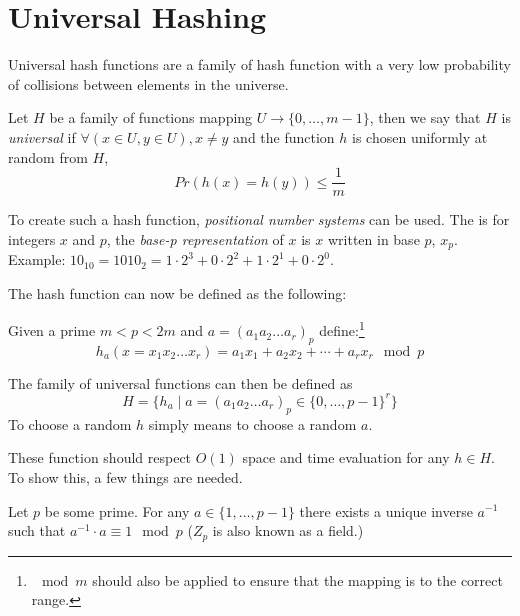     \section{Universal Hashing}

        Universal hash functions are a family of hash function with a very low probability of collisions between elements in the universe.

        \begin{definition}
        Let $H$ be a family of functions mapping $U \rightarrow \{0, \ldots, m-1\}$, then we say that $H$ is \emph{universal} if $\forall (x \in U, y \in U), x \not = y$ and the function $h$ is chosen uniformly at random from $H$,
            \[ Pr(h(x) = h(y)) \leq \frac{1}{m} \]
        \end{definition}

        To create such a hash function, \emph{positional number systems} can be used. The is for integers $x$ and $p$, the \emph{base-p representation} of $x$ is $x$ written in base $p$, $x_p$. Example: $10_{10} = 1010_2 = 1 \cdot 2^3 + 0 \cdot 2^2 + 1 \cdot 2^1 + 0 \cdot 2^0$.

        The hash function can now be defined as the following:

        \begin{definition}
            Given a prime $m < p < 2m$ and $a = (a_1 a_2 \ldots a_r)_p$ define:\footnote{$\mod m$ should also be applied to ensure that the mapping is to the correct range.}
            \[ h_a(x = x_1 x_2 \ldots x_r) = a_1 x_1 + a_2 x_2 + \cdots + a_r x_r \mod p \]
        \end{definition}

        The family of universal functions can then be defined as
        \[ H = \{ h_a \mid a = (a_1 a_2 \ldots a_r)_p \in \{0, \ldots, p-1\}^r\} \]
        To choose a random $h$ simply means to choose a random $a$.

        These function should respect $O(1)$ space and time evaluation for any $h \in H$.
        To show this, a few things are needed.

        \begin{lemma}
            Let $p$ be some prime.
            For any $a \in \{1, \ldots, p - 1\}$ there exists a unique inverse $a^{-1}$ such that $a^{-1} \cdot a \equiv 1 \mod p$ ($Z_p$ is also known as a field.)
        \end{lemma}

